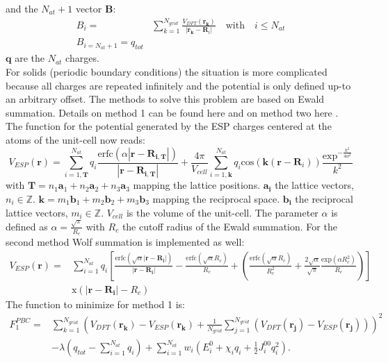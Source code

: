 and the $N_{at}+1$ vector $\mathbf{B}$:
\begin{align}
 B_i=&\sum_{k=1}^{N_{grid}}\frac{V_{DFT}(\mathbf{r_k})}{|\mathbf{r_k}-\mathbf{R}_i|}\quad \mathrm{with}\quad i\leq N_{at}\\
 B_{i=N_{at}+1}=q_{tot}
\end{align}
$\mathbf{q}$ are the $N_{at}$ charges.\\
For solids (periodic boundary conditions) the situation is more complicated because all charges are repeated infinitely and the 
potential is only defined up-to an arbitrary offset. The methods to solve this problem are based on Ewald summation. 
Details on method 1 can be found here \cite{Campana2009} and on method two here \cite{Chen2010}. The function for the potential 
generated by the ESP charges centered at the atoms of the unit-cell now reads:
\begin{equation}
 V_{ESP}(\mathbf{r})=\sum_{i=1,\mathbf{T}}^{N_{at}}q_i\frac{\mathrm{erfc}(\alpha|\mathbf{r}-\mathbf{R_{i,\mathbf{T}}}|)}{|\mathbf{r}-\mathbf{R_{i,\mathbf{T}}}|}+\frac{4\pi}{V_{cell}}\sum_{i=1,\mathbf{k}}^{N_{at}}q_i\mathrm{cos}(\mathbf{k}(\mathbf{r}-\mathbf{R}_{i}))\frac{\mathrm{exp}^{-\frac{k^2}{4\alpha^2}}}{k^2}\label{V_Ewald}
\end{equation}
with $\mathbf{T}=n_1\mathbf{a}_1+n_2\mathbf{a}_2+n_3\mathbf{a}_3$ mapping the lattice positions. $\mathbf{a_i}$ the lattice vectors, 
$n_i \in \mathbb{Z}$. $\mathbf{k}=m_1\mathbf{b}_1+m_2\mathbf{b}_2+m_3\mathbf{b}_3$ mapping the reciprocal space. $\mathbf{b_i}$ the 
reciprocal lattice vectors, $m_i \in \mathbb{Z}$. $V_{cell}$ is the volume of the unit-cell. The parameter $\alpha$ is 
defined as $\alpha=\frac{\sqrt{\pi}}{R_c}$ with $R_c$ the cutoff radius of the 
Ewald summation. For the second method Wolf summation is implemented as well:
\begin{align}
 V_{ESP}(\mathbf{r})=&\sum_{i=1}^{N_{at}}q_i\left[\frac{\mathrm{erfc}(\sqrt{\alpha}|\mathbf{r}-\mathbf{R_{i}}|)}{|\mathbf{r}-\mathbf{R_{i}}|}-\frac{\mathrm{erfc}(\sqrt{\alpha}R_c)}{R_c}+\left(\frac{\mathrm{erfc}(\sqrt{\alpha}R_c)}{R_c^2}+\frac{2\sqrt{\alpha}}{\sqrt{\pi}}\frac{\mathrm{exp}(\alpha R_c^2)}{R_c}\right)\right]\label{V_Wolf}\\
                     &\mathrm{x}(|\mathbf{r}-\mathbf{R_{i}}|-R_c)\nonumber
\end{align}
The function to minimize for method 1 is:
\begin{align}
 F_1^{PBC}=&\sum_{k=1}^{N_{grid}}\left(V_{DFT}(\mathbf{r_k})-V_{ESP}(\mathbf{r_k})+\frac{1}{N_{grid}}\sum_{j=1}^{N_{grid}}\left(V_{DFT}(\mathbf{r_j})-V_{ESP}(\mathbf{r_j})\right)\right)^2\\\nonumber
           &-\lambda\left(q_{tot}-\sum_{i=1}^{N_{at}}q_i\right)+\sum_{i=1}^{N_{at}}w_i\left(E_i^0+\chi_i q_i+\frac{1}{2}J_i^{00}q_i^2\right). \label{F_esp_pbc1}
\end{align}
